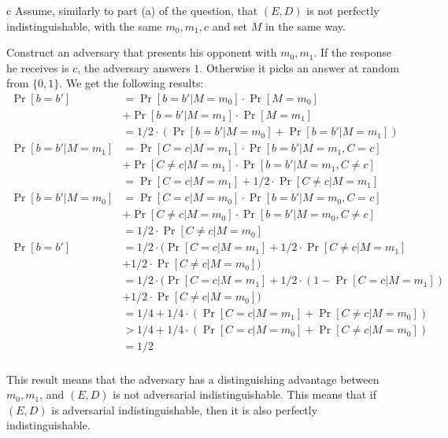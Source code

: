 \documentclass{article}
\begin{document}
\begin{paragraph}
	c Assume, similarly to part (a) of the question, that $(E,D)$ is not perfectly indistinguishable, with the same $m_0, m_1, c$ and set $M$ in the same way.

	Construct an adversary that presents his opponent with $m_0, m_1$. If the response he receives is $c$, the adversary answers $1$. Otherwise it picks an answer at random from $\{0, 1\}$. We get the following results:
	\begin{align*}
		\Pr[b = b']          & = \Pr[b = b' | M = m_0] \cdot \Pr[M = m_0]                               \\
		                     & + \Pr[b = b' | M = m_1] \cdot \Pr[M = m_1]                               \\
		                     & = 1/2 \cdot (\Pr[b = b' | M = m_0] + \Pr[b = b' | M = m_1])              \\
		\Pr[b = b'| M = m_1] & = \Pr[C = c | M = m_1] \cdot \Pr[b = b'| M = m_1, C = c]                 \\
		                     & + \Pr[C \neq c | M = m_1] \cdot \Pr[b = b'| M = m_1, C \neq c]           \\
		                     & = \Pr[C = c | M = m_1] + 1/2 \cdot \Pr[C \neq c | M = m_1]               \\
		\Pr[b = b'| M = m_0] & = \Pr[C = c | M = m_0] \cdot \Pr[b = b'| M = m_0, C = c]                 \\
		                     & + \Pr[C \neq c | M = m_0] \cdot \Pr[b = b'| M = m_0, C \neq c]           \\
		                     & = 1/2 \cdot \Pr[C \neq c | M = m_0]                                      \\
		\Pr[b = b']          & = 1/2 \cdot (\Pr[C = c | M = m_1] + 1/2 \cdot \Pr[C \neq c | M = m_1]    \\
		                     & + 1/2 \cdot \Pr[C \neq c | M = m_0])                                     \\
		                     & = 1/2 \cdot (\Pr[C = c | M = m_1] + 1/2 \cdot (1 - \Pr[C = c | M = m_1]) \\
		                     & + 1/2 \cdot \Pr[C \neq c | M = m_0])                                     \\
		                     & = 1/4 + 1/4 \cdot (\Pr[C = c | M = m_1] + \Pr[C \neq c | M = m_0])       \\
		                     & > 1/4 + 1/4 \cdot (\Pr[C = c | M = m_0] + \Pr[C \neq c | M = m_0])       \\
		                     & = 1/2                                                                    \\
	\end{align*}

	This result means that the adversary has a distinguishing advantage between $m_0, m_1$, and $(E, D)$ is not adversarial indistinguishable. This means that if $(E, D)$ is adversarial indistinguishable, then it is also perfectly indistinguishable.
\end{paragraph}
\end{document}
